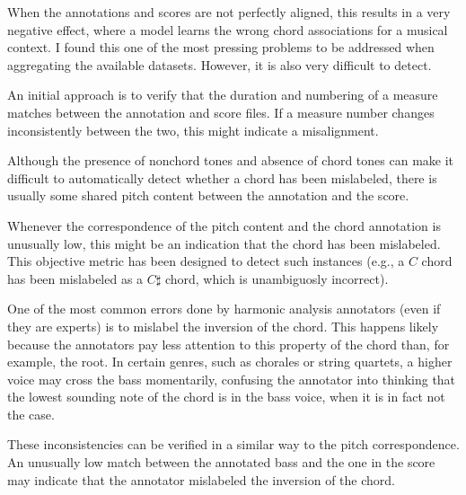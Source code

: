 



When the annotations and scores are not perfectly aligned,
this results in a very negative effect, where a model learns
the wrong chord associations for a musical context. I found
this one of the most pressing problems to be addressed when
aggregating the available datasets. However, it is also very
difficult to detect.

An initial approach is to verify that the duration and
numbering of a measure matches between the annotation and
score files. If a measure number changes inconsistently
between the two, this might indicate a misalignment.


Although the presence of nonchord tones and absence of chord
tones can make it difficult to automatically detect whether
a chord has been mislabeled, there is usually some shared
pitch content between the annotation and the score.

Whenever the correspondence of the pitch content and the
chord annotation is unusually low, this might be an
indication that the chord has been mislabeled. This
objective metric has been designed to detect such instances
(e.g., a $C$ chord has been mislabeled as a $C\sharp$ chord,
which is unambiguosly incorrect).



One of the most common errors done by harmonic analysis
annotators (even if they are experts) is to mislabel the
inversion of the chord. This happens likely because the
annotators pay less attention to this property of the chord
than, for example, the root. In certain genres, such as
chorales or string quartets, a higher voice may cross the
bass momentarily, confusing the annotator into thinking that
the lowest sounding note of the chord is in the bass voice,
when it is in fact not the case.

These inconsistencies can be verified in a similar way to
the pitch correspondence. An unusually low match between the
annotated bass and the one in the score may indicate that
the annotator mislabeled the inversion of the chord.
